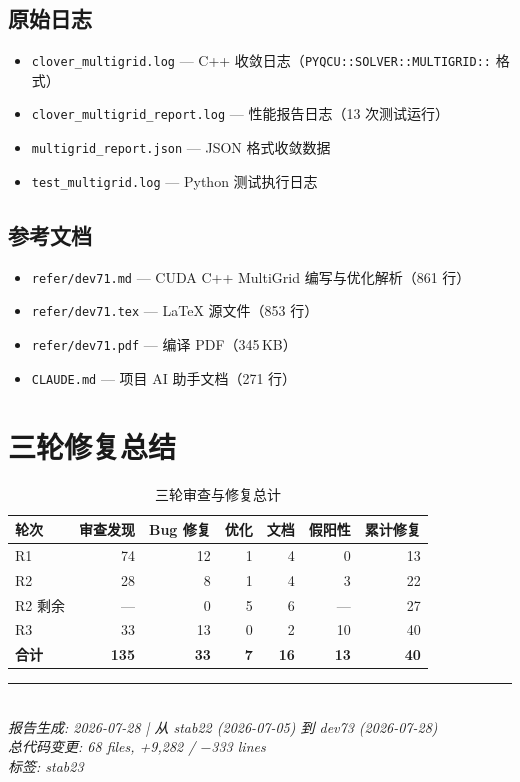 \documentclass[11pt,a4paper]{article}
\begin{document}
\subsection{原始日志}

\begin{itemize}
    \item \texttt{clover\_multigrid.log} — C++ 收敛日志（\texttt{PYQCU::SOLVER::MULTIGRID::} 格式）
    \item \texttt{clover\_multigrid\_report.log} — 性能报告日志（13 次测试运行）
    \item \texttt{multigrid\_report.json} — JSON 格式收敛数据
    \item \texttt{test\_multigrid.log} — Python 测试执行日志
\end{itemize}

\subsection{参考文档}

\begin{itemize}
    \item \texttt{refer/dev71.md} — CUDA C++ MultiGrid 编写与优化解析（861 行）
    \item \texttt{refer/dev71.tex} — \LaTeX{} 源文件（853 行）
    \item \texttt{refer/dev71.pdf} — 编译 PDF（345\,KB）
    \item \texttt{CLAUDE.md} — 项目 AI 助手文档（271 行）
\end{itemize}

\section{三轮修复总结}

\begin{table}[ht]
\centering
\caption{三轮审查与修复总计}
\begin{tabular}{lrrrrrr}
\toprule
轮次 & 审查发现 & Bug 修复 & 优化 & 文档 & 假阳性 & 累计修复 \\
\midrule
R1 & 74 & 12 & 1 & 4 & 0 & 13 \\
R2 & 28 & 8 & 1 & 4 & 3 & 22 \\
R2 剩余 & — & 0 & 5 & 6 & — & 27 \\
R3 & 33 & 13 & 0 & 2 & 10 & 40 \\
\midrule
\textbf{合计} & \textbf{135} & \textbf{33} & \textbf{7} & \textbf{16} & \textbf{13} & \textbf{40} \\
\bottomrule
\end{tabular}
\end{table}

\vspace{1cm}
\begin{center}
\rule{0.5\textwidth}{0.4pt}\\[4pt]
\textit{报告生成: 2026-07-28 \quad | \quad 从 stab22 (2026-07-05) 到 dev73 (2026-07-28)}\\[4pt]
\textit{总代码变更: 68 files, +9,282 / $-$333 lines}\\[4pt]
\textit{标签: stab23}
\end{center}
\end{document}
